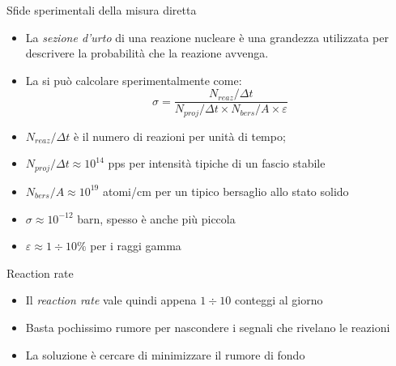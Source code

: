 \documentclass [xcolor=svgnames] {beamer}
\begin{document}
\begin{frame}{Sfide sperimentali della misura diretta}
	\begin{itemize}
		\item<1-> La \emph{sezione d'urto} di una reazione nucleare è una grandezza utilizzata per descrivere la probabilità che la reazione avvenga.
		\item<2-> La si può calcolare sperimentalmente come:
		\begin{equation}
			\sigma = \dfrac{N_{reaz}/\Delta t}{N_{proj}/\Delta t \times N_{bers}/A \times \varepsilon}
		\end{equation}
	\item<3-> $N_{reaz}/\Delta t$ è il numero di reazioni per unità di tempo;
	\item<4-> $N_{proj}/\Delta t \approx 10^{14}$ pps per intensità tipiche di un fascio stabile
	\item<5-> $N_{bers}/A \approx 10^{19}$ atomi/cm per un tipico bersaglio allo stato solido
	\item<6-> $\sigma \approx 10^{-12}$ barn, spesso è anche più piccola
	\item<7-> $\varepsilon \approx 1 \div 10 \%$ per i raggi gamma
	\end{itemize}
\end{frame}
\begin{frame}{Reaction rate}
	\begin{itemize}
		\item<1-> Il \emph{reaction rate} vale quindi appena $1\div 10$ conteggi al giorno
		\item<2-> Basta pochissimo rumore per nascondere i segnali che rivelano le reazioni
		\item<3-> La soluzione è cercare di minimizzare il rumore di fondo 
	\end{itemize}
\end{frame}
\end{document}
